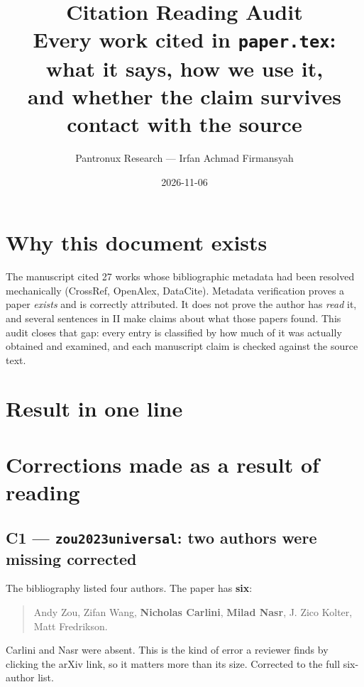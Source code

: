 \documentclass[10pt,a4paper]{article}
\title{\vspace{-1.6cm}\textbf{Citation Reading Audit}\\[2pt]
\large Every work cited in \texttt{paper.tex}: what it says, how we use it,\\
and whether the claim survives contact with the source}
\author{Pantronux Research --- Irfan Achmad Firmansyah}
\date{2026-11-06}
\newcommand{\fix}{\textcolor{red!75!black}{\textbf{corrected}}}
\begin{document}
\maketitle
\vspace{-0.5cm}

\section*{Why this document exists}

The manuscript cited 27 works whose bibliographic metadata had been resolved mechanically
(CrossRef, OpenAlex, DataCite). Metadata verification proves a paper \emph{exists} and is
correctly attributed. It does not prove the author has \emph{read} it, and several sentences in
\textsection II make claims about what those papers found. This audit closes that gap: every entry
is classified by how much of it was actually obtained and examined, and each manuscript claim is
checked against the source text.

\section*{Result in one line}

\begin{center}
\end{center}

\section{Corrections made as a result of reading}

\subsection*{C1 --- \texttt{zou2023universal}: two authors were missing \fix}

The bibliography listed four authors. The paper has \textbf{six}:
\begin{quote}\small
Andy Zou, Zifan Wang, \textbf{Nicholas Carlini}, \textbf{Milad Nasr}, J. Zico Kolter,
Matt Fredrikson.
\end{quote}
Carlini and Nasr were absent. This is the kind of error a reviewer finds by clicking the arXiv
link, so it matters more than its size. Corrected to the full six-author list.
\end{document}
